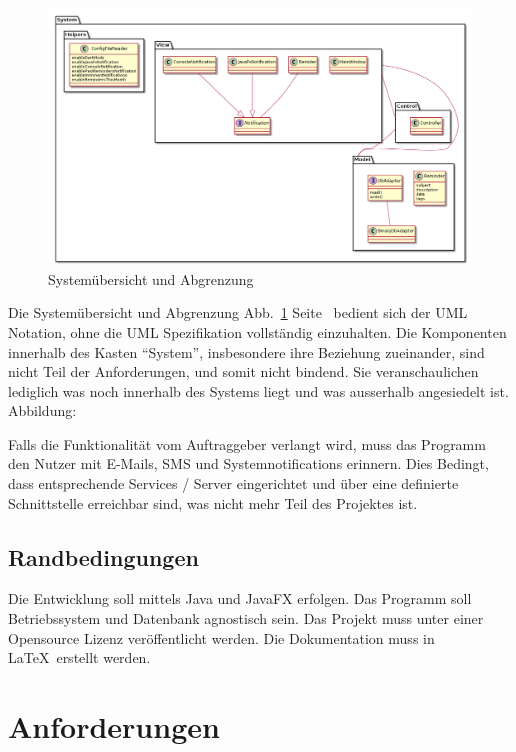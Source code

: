 \documentclass[11pt,titelpage]{scrartcl}
\begin{document}
\begin{landscape}
\begin{figure}
  \centering
    \includegraphics[width=1\textwidth]{../uml/uebersicht.png}
  \caption{Systemübersicht und Abgrenzung}
  \label{fig:overview}
\end{figure}
\end{landscape}
Die Systemübersicht und Abgrenzung Abb.~\ref{fig:overview} Seite~\pageref{fig:overview} bedient sich der UML Notation, ohne die UML Spezifikation vollständig einzuhalten. Die Komponenten innerhalb des Kasten ``System'', insbesondere ihre Beziehung zueinander,  sind nicht Teil der Anforderungen, und somit nicht bindend. Sie veranschaulichen lediglich was noch innerhalb des Systems liegt und was ausserhalb angesiedelt ist. 
Abbildung:\pageref{fig:overview}




Falls die Funktionalität vom Auftraggeber verlangt wird, muss das Programm den Nutzer mit E-Mails, SMS und Systemnotifications erinnern. Dies Bedingt, dass entsprechende Services / Server eingerichtet und über eine definierte Schnittstelle erreichbar sind, was nicht mehr Teil des Projektes ist.

\subsection{Randbedingungen}
Die Entwicklung soll mittels Java und JavaFX erfolgen.
Das Programm soll Betriebssystem und Datenbank agnostisch sein. Das Projekt muss unter einer Opensource Lizenz veröffentlicht werden.
Die Dokumentation muss in \LaTeX ~erstellt werden.


\section{Anforderungen}
\end{document}
